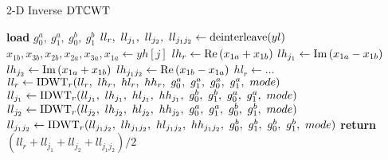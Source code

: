 \begin{algorithm}[tb]
\caption{2-D Inverse $\mathrm{DT}\mathbb{C}\mathrm{WT}$}\label{alg:ch3:idtcwt}
\begin{algorithmic}[1]
\State \textbf{load} $g_0^a,\ g_1^a,\ g_0^b,\ g_1^b$ 
\State $ll_{r},\ ll_{j_1},\ ll_{j_2},\ ll_{j_1j_2} \gets \mathrm{deinterleave}(yl)$
\State $x_{1b},x_{3b}, x_{2b}, x_{2a}, x_{3a}, x_{1a} \gets yh[j] $
\State $lh_{r} \gets \mathrm{Re}\left(x_{1a} + x_{1b}\right)$
\State $lh_{j_1} \gets \mathrm{Im}\left(x_{1a} - x_{1b}\right)$
\State $lh_{j_2} \gets \mathrm{Im}\left(x_{1a} + x_{1b}\right)$
\State $lh_{j_1j_2} \gets \mathrm{Re}\left(x_{1b} - x_{1a}\right)$
\State $hl_{r} \gets \ldots $ 
\State $ll_{r} \gets \F{IDWT}_r(ll_{r},\ lh_{r},\ hl_{r},\ hh_{r},\ g_0^a,\ g_1^a,\ g_0^a,\ g_1^a,\ mode)$
\State $ll_{j_1} \gets \F{IDWT}_r(ll_{j_1},\ lh_{j_1},\ hl_{j_1},\ hh_{j_1},\ g_0^b,\ g_1^b,\ g_0^a,\ g_1^a,\ mode)$
\State $ll_{j_2} \gets \F{IDWT}_r(ll_{j_2},\ lh_{j_2},\ hl_{j_2},\ hh_{j_2},\ g_0^a,\ g_1^a,\ g_0^b,\ g_1^b,\ mode)$
\State $ll_{j_1j_2} \gets \F{IDWT}_r(ll_{j_1j_2},\ lh_{j_1j_2},\ hl_{j_1j_2},\ hh_{j_1j_2},\ g_0^b,\ g_1^b,\ g_0^b,\ g_1^b,\ mode)$
\EndFor
\State \textbf{return} $\left(ll_{r} + ll_{j_1} + ll_{j_2} + ll_{j_1j_2}\right)/2$
\EndFunction
\end{algorithmic}
\end{algorithm}
